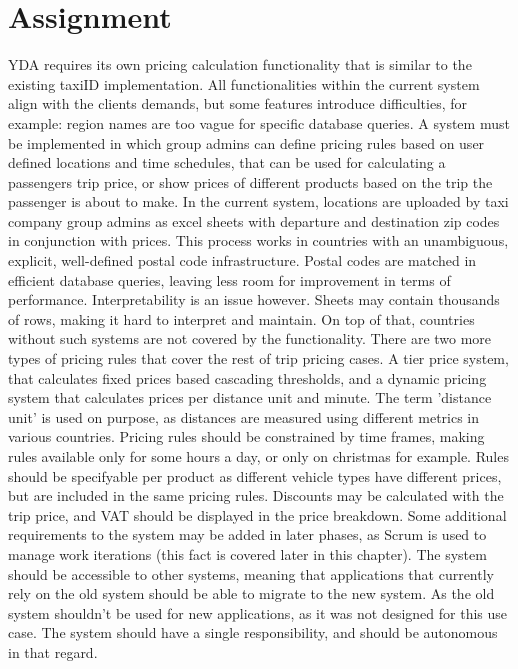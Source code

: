 \section{Assignment}
YDA requires its own pricing calculation functionality that is similar to the existing taxiID implementation. All functionalities within the current system align with the clients demands, but some features introduce difficulties, for example: region names are too vague for specific database queries. A system must be implemented in which group admins can define pricing rules based on user defined locations and time schedules, that can be used for calculating a passengers trip price, or show prices of different products based on the trip the passenger is about to make. In the current system, locations are uploaded by taxi company group admins as excel sheets with departure and destination zip codes in conjunction with prices. This process works in countries with an unambiguous, explicit, well-defined postal code infrastructure. Postal codes are matched in efficient database queries, leaving less room for improvement in terms of performance. Interpretability is an issue however. Sheets may contain thousands of rows, making it hard to interpret and maintain. On top of that, countries without such systems are not covered by the functionality. There are two more types of pricing rules that cover the rest of trip pricing cases. A tier price system, that calculates fixed prices based cascading thresholds, and a dynamic pricing system that calculates prices per distance unit and minute. The term 'distance unit' is used on purpose, as distances are measured using different metrics in various countries. Pricing rules should be constrained by time frames, making rules available only for some hours a day, or only on christmas for example. Rules should be specifyable per product as different vehicle types have different prices, but are included in the same pricing rules. Discounts may be calculated with the trip price, and VAT should be displayed in the price breakdown. Some additional requirements to the system may be added in later phases, as Scrum is used to manage work iterations (this fact is covered later in this chapter). The system should be accessible to other systems, meaning that applications that currently rely on the old system should be able to migrate to the new system. As the old system shouldn't be used for new applications, as it was not designed for this use case. The system should have a single responsibility, and should be autonomous in that regard.


